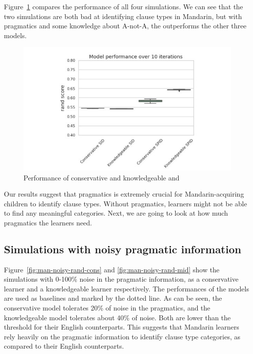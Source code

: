 Figure~\ref{fig:man-rand-compare-mid} compares the performance of all four simulations. We can see that the two \dlearnerabbr{} simulations are both bad at identifying clause types in Mandarin, but with pragmatics and some knowledge about A-not-A, the \plearnerabbr{} outperforms the other three models. 
\begin{figure}[H]
    \centering
    \includegraphics[width=1\textwidth]{figures/man-rand-compare-mid.jpg}
    \caption{Performance of conservative and knowledgeable \dlearnerabbr{} and \plearnerabbr{}}
    \label{fig:man-rand-compare-mid}
\end{figure}

Our results suggest that pragmatics is extremely crucial for Mandarin-acquiring children to identify clause types. Without pragmatics, learners might not be able to find any meaningful categories. Next, we are going to look at how much pragmatics the learners need.

\subsection{Simulations with noisy pragmatic information}
\label{sec:mancl:model:results:noisy}

Figure~\ref{fig:man-noisy-rand-cons} and \ref{fig:man-noisy-rand-mid} show the simulations with 0-100\% noise in the pragmatic information, as a conservative learner and a knowledgeable learner respectively. The performances of the \dlearnerabbr{} models are used as baselines and marked by the dotted line. As can be seen, the conservative \plearnerabbr{} model tolerates 20\% of noise in the pragmatics, and the knowledgeable model tolerates about 40\% of noise. Both are lower than the threshold for their English counterparts. This suggests that Mandarin learners rely heavily on the pragmatic information to identify clause type categories, as compared to their English counterparts. 

